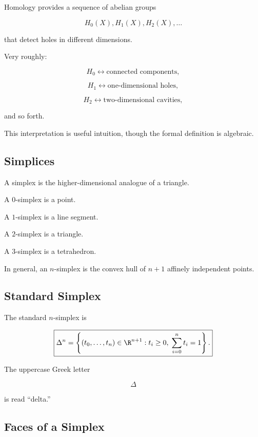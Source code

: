 Homology provides a sequence of abelian groups

\[
\boxed{
H_0(X),
H_1(X),
H_2(X),
\ldots
}
\]

that detect holes in different dimensions.

Very roughly:

\[
\boxed{
H_0
\longleftrightarrow
\text{connected components},
}
\]

\[
\boxed{
H_1
\longleftrightarrow
\text{one-dimensional holes},
}
\]

\[
\boxed{
H_2
\longleftrightarrow
\text{two-dimensional cavities},
}
\]

and so forth.

This interpretation is useful intuition, though the formal definition is
algebraic.

\subsection{Simplices}
\label{subsec:simplices}

A simplex is the higher-dimensional analogue of a triangle.

A \(0\)-simplex is a point.

A \(1\)-simplex is a line segment.

A \(2\)-simplex is a triangle.

A \(3\)-simplex is a tetrahedron.

In general, an \(n\)-simplex is the convex hull of \(n+1\) affinely
independent points.

\subsection{Standard Simplex}
\label{subsec:standard-simplex}

The standard \(n\)-simplex is

\[
\boxed{
\Delta^n
=
\left\{
(t_0,\ldots,t_n)\in\R^{n+1}:
t_i\geq0,
\;
\sum_{i=0}^{n}t_i=1
\right\}.
}
\]

The uppercase Greek letter

\[
\Delta
\]

is read ``delta.''

\subsection{Faces of a Simplex}
\label{subsec:faces-simplex}

